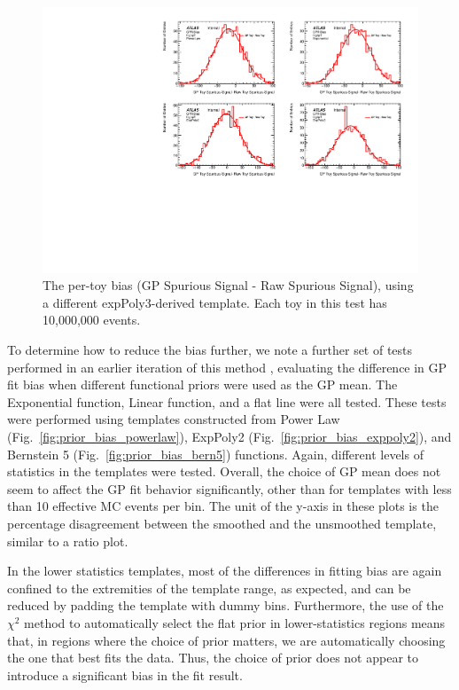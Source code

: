 \begin{figure} 
\begin{center}
  \includegraphics[width=\textwidth]{figures/background/gpr/validation/nominal/ToyTest_FitSigBiases_highpT_10M_noSig}   
\caption{The per-toy bias (GP Spurious Signal - Raw Spurious Signal), using a different expPoly3-derived template. Each toy in this test has 10,000,000 events.}
\label{fig:bias_highpt_10M_noSig}
\end{center}
\end{figure}

To determine how to reduce the bias further, we note a further set of tests performed in an earlier iteration of this method \cite{Hyneman}, evaluating the difference in GP fit bias when different functional priors were used as the GP mean. The Exponential function, Linear function, and a flat line were all tested. These tests were performed using templates constructed from Power Law (Fig.~\ref{fig:prior_bias_powerlaw}), ExpPoly2 (Fig.~\ref{fig:prior_bias_exppoly2}), and Bernstein 5 (Fig.~\ref{fig:prior_bias_bern5}) functions. Again, different levels of statistics in the templates were tested. Overall, the choice of GP mean does not seem to affect the GP fit behavior significantly, other than for templates with less than 10 effective MC events per bin. The unit of the y-axis in these plots is the percentage disagreement between the smoothed and the unsmoothed template, similar to a ratio plot.

In the lower statistics templates, most of the differences in fitting bias are again confined to the extremities of the template range, as expected, and can be reduced by padding the template with dummy bins. Furthermore, the use of the $\chi^2$ method to automatically select the flat prior in lower-statistics regions means that, in regions where the choice of prior matters, we are automatically choosing the one that best fits the data. Thus, the choice of prior does not appear to introduce a significant bias in the fit result. 

